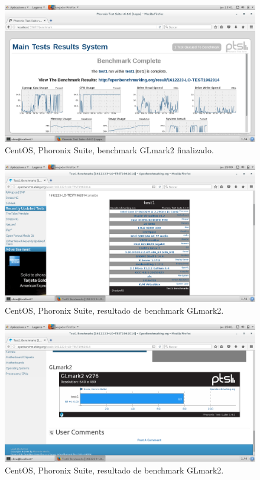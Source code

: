 \begin{figure}[H] 
	\centering
	\includegraphics[width=14.7cm]{./img/ejercicio1_13.png} 	
	\caption{CentOS, Phoronix Suite, benchmark GLmark2 finalizado.} \label{fig:ejercicio1_13}
\end{figure}

\begin{figure}[H] 
	\centering
	\includegraphics[width=14.7cm]{./img/ejercicio1_14.png} 	
	\caption{CentOS, Phoronix Suite, resultado de benchmark GLmark2.} \label{fig:ejercicio1_14}
\end{figure}

\begin{figure}[H] 
	\centering
	\includegraphics[width=14.7cm]{./img/ejercicio1_15.png} 	
	\caption{CentOS, Phoronix Suite, resultado de benchmark GLmark2.} \label{fig:ejercicio1_15}
\end{figure}

